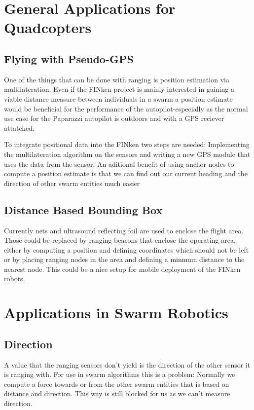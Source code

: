 


\section{General Applications for Quadcopters}
\subsection{Flying with Pseudo-GPS}
One of the things that can be done with ranging is position estimation via multilateration.
Even if the FINken project is mainly interested in gaining a viable distance measure between individuals in a swarm a position estimate would be beneficial for the performance of the autopilot-especially as the normal use case for the Paparazzi autopilot is outdoors and with a GPS reciever attatched.

To integrate positional data into the FINken two steps are needed: Implementing the multilateration algorithm on the sensors and writing a new GPS module that uses the data from the sensor.
An aditional benefit of using anchor nodes to compute a position estimate is that we can find out our current heading and the direction of other swarm entities much easier

\subsection{Distance Based Bounding Box}
\label{boundingbox}
Currently nets and ultrasound reflecting foil are used to enclose the flight area.
Those could be replaced by ranging beacons that enclose the operating area, either by computing a position and defining coordinates which should not be left or by placing ranging nodes in the area and defining a minmum distance to the nearest node.
This could be a nice setup for mobile deployment of the FINken robots.


\section{Applications in Swarm Robotics}

\subsection{Direction}
A value that the ranging sensors don't yield is the direction of the other sensor it is ranging with.
For use in swarm algorithms this is a problem: Normally we compute a force towards or from the other swarm entities that is based on distance and direction.
This way is still blocked for us as we can't measure direction.

